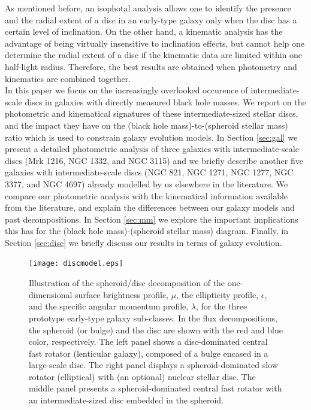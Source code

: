 \documentclass[useAMS,usenatbib,article]{mnras}
\begin{document}
{As mentioned before, an isophotal analysis allows one to identify the presence and the radial extent of a disc in an early-type galaxy 
only when the disc has a certain level of inclination. 
On the other hand, a kinematic analysis has the advantage of being virtually insensitive to inclination effects, 
but cannot help one determine the radial extent of a disc if the kinematic data are limited within one half-light radius. 
Therefore, the best results are obtained when photometry and kinematics are combined together. \\
In this paper we focus on the increasingly overlooked occurence of intermediate-scale discs in galaxies with directly measured black hole masses. 
We report on the photometric and kinematical signatures of these intermediate-sized stellar discs,  
and the impact they have on the (black hole mass)-to-(spheroid stellar mass) ratio 
which is used to constrain galaxy evolution models. 
In Section \ref{sec:gal} we present a detailed photometric analysis of three galaxies with intermediate-scale discs (Mrk 1216, NGC 1332, and NGC 3115) 
and we briefly describe another five galaxies with intermediate-scale discs (NGC 821, NGC 1271, NGC 1277, NGC 3377, and NGC 4697) 
already modelled by us elsewhere in the literature. 
We compare our photometric analysis with the kinematical information available from the literature, 
and explain the differences between our galaxy models and past decompositions. 
In Section \ref{sec:mm} we explore the important implications this has for the (black hole mass)-(spheroid stellar mass) diagram. 
Finally, in Section \ref{sec:disc} we briefly discuss our results in terms of galaxy evolution. }




\begin{figure}
\begin{center}
\texttt{[image: discmodel.eps]}
\caption{Illustration of the spheroid/disc decomposition of the one-dimensional surface brightness profile, $\mu$, 
the ellipticity profile, $\epsilon$, and the specific angular momentum profile, $\lambda$,
for the three prototype early-type galaxy sub-classes. 
In the flux decompositions, the spheroid (or bulge) and the disc are shown with the red and blue color, respectively. 
The left panel shows a disc-dominated central fast rotator (lenticular galaxy), composed of a bulge encased in a large-scale disc. 
The right panel displays a spheroid-dominated slow rotator (elliptical) with (an optional) nuclear stellar disc. 
The middle panel presents a spheroid-dominated central fast rotator with an intermediate-sized disc embedded in the spheroid. }
\label{fig:model}
\end{center}
\end{figure}
\end{document}
